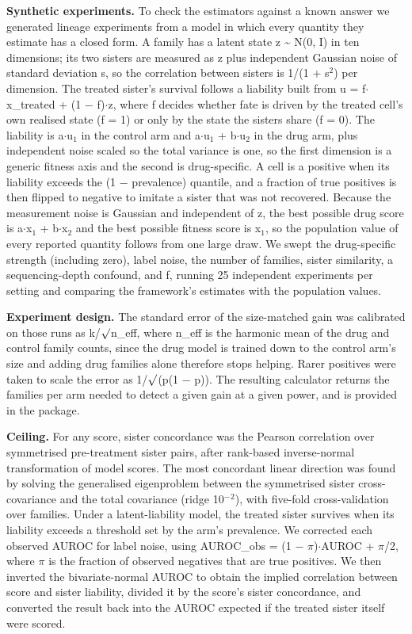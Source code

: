 \documentclass[11pt,a4paper]{article}
\begin{document}
\textbf{Synthetic experiments.} To check the estimators against a known answer we generated lineage experiments from a model in which every quantity they estimate has a closed form. A family has a latent state z \textasciitilde{} N(0, I) in ten dimensions; its two sisters are measured as z plus independent Gaussian noise of standard deviation s, so the correlation between sisters is 1/(1 + s$^2$) per dimension. The treated sister's survival follows a liability built from u = f$\cdot$x\_treated + (1 $-$ f)$\cdot$z, where f decides whether fate is driven by the treated cell's own realised state (f = 1) or only by the state the sisters share (f = 0). The liability is a$\cdot$u$_1$ in the control arm and a$\cdot$u$_1$ + b$\cdot$u$_2$ in the drug arm, plus independent noise scaled so the total variance is one, so the first dimension is a generic fitness axis and the second is drug-specific. A cell is a positive when its liability exceeds the (1 $-$ prevalence) quantile, and a fraction of true positives is then flipped to negative to imitate a sister that was not recovered. Because the measurement noise is Gaussian and independent of z, the best possible drug score is a$\cdot$x$_1$ + b$\cdot$x$_2$ and the best possible fitness score is x$_1$, so the population value of every reported quantity follows from one large draw. We swept the drug-specific strength (including zero), label noise, the number of families, sister similarity, a sequencing-depth confound, and f, running 25 independent experiments per setting and comparing the framework's estimates with the population values.

\textbf{Experiment design.} The standard error of the size-matched gain was calibrated on those runs as k/$\surd$n\_eff, where n\_eff is the harmonic mean of the drug and control family counts, since the drug model is trained down to the control arm's size and adding drug families alone therefore stops helping. Rarer positives were taken to scale the error as 1/$\surd$(p(1 $-$ p)). The resulting calculator returns the families per arm needed to detect a given gain at a given power, and is provided in the package.

\textbf{Ceiling.} For any score, sister concordance was the Pearson correlation over symmetrised pre-treatment sister pairs, after rank-based inverse-normal transformation of model scores. The most concordant linear direction was found by solving the generalised eigenproblem between the symmetrised sister cross-covariance and the total covariance (ridge 10$^-$$^2$), with five-fold cross-validation over families. Under a latent-liability model, the treated sister survives when its liability exceeds a threshold set by the arm's prevalence. We corrected each observed AUROC for label noise, using AUROC\_obs = (1 $-$ $\pi$)$\cdot$AUROC + $\pi$/2, where $\pi$ is the fraction of observed negatives that are true positives. We then inverted the bivariate-normal AUROC to obtain the implied correlation between score and sister liability, divided it by the score's sister concordance, and converted the result back into the AUROC expected if the treated sister itself were scored.
\end{document}
